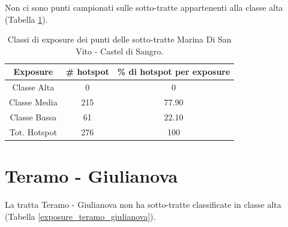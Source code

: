 Non ci sono punti campionati sulle sotto-tratte appartenenti alla classe alta (Tabella \ref{risultati_marina_sangro}).

\begin{table}[H]
	\centering
	\begin{tabular}{|c|c|c|}
		\hline
		\rowcolor[HTML]{C0C0C0} 
		\textbf{Exposure} & \textbf{\# hotspot} & \textbf{\% di hotspot per exposure} \\ \hline
		Classe Alta       & 0                  & 0                                   \\ \hline
		Classe Media      & 215                 & 77.90                             \\ \hline
		Classe Bassa      & 61              & 22.10                             \\ \hline
		Tot. Hotspot      & 276                & 100                                 \\ \hline
	\end{tabular}
	\caption{Classi di exposure dei punti delle sotto-tratte Marina Di San Vito - Castel di Sangro.}
	\label{risultati_marina_sangro}
\end{table}

\section{Teramo - Giulianova}
La tratta Teramo - Giulianova non ha sotto-tratte classificate in classe alta (Tabella \ref{exposure_teramo_giulianova}).

